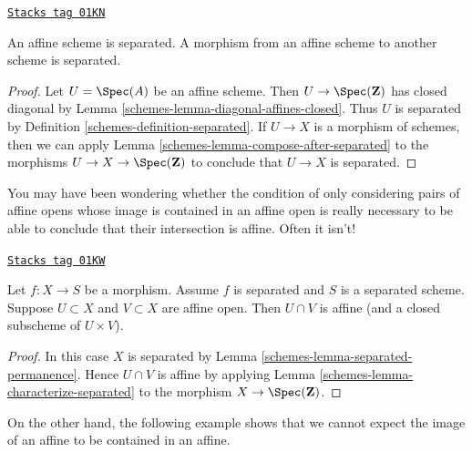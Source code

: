 \begin{lemma}
\label{schemes-lemma-affine-separated}
\href{https://stacks.math.columbia.edu/tag/01KN}{\texttt{Stacks tag 01KN}}

An affine scheme is separated. A morphism from an affine scheme
to another scheme is separated.
\end{lemma}

\begin{proof}

Let $U = \Spec(A)$ be an affine scheme. Then $U \to \Spec(\mathbf{Z})$
has closed diagonal by Lemma \ref{schemes-lemma-diagonal-affines-closed}.
Thus $U$ is separated by Definition \ref{schemes-definition-separated}.
If $U \to X$ is a morphism of schemes, then we can apply
Lemma \ref{schemes-lemma-compose-after-separated}
to the morphisms $U \to X \to \Spec(\mathbf{Z})$ to conclude
that $U \to X$ is separated.
\end{proof}

You may have been wondering whether the condition
of only considering pairs of affine opens whose image is contained
in an affine open is really necessary to be able to conclude
that their intersection is affine. Often it isn't!

\begin{lemma}[Curiosity]
\label{schemes-lemma-curiosity}
\href{https://stacks.math.columbia.edu/tag/01KW}{\texttt{Stacks tag 01KW}}

Let $f : X \to S$ be a morphism.
Assume $f$ is separated and $S$ is a separated scheme.
Suppose $U \subset X$ and $V \subset X$ are affine open.
Then $U \cap V$ is affine (and a closed subscheme of $U \times V$).
\end{lemma}

\begin{proof}

In this case $X$ is separated by Lemma \ref{schemes-lemma-separated-permanence}.
Hence $U \cap V$ is affine by
applying Lemma \ref{schemes-lemma-characterize-separated} to the
morphism $X \to \Spec(\mathbf{Z})$.
\end{proof}

On the other hand, the following example shows that we cannot
expect the image of an affine to be contained in an affine.

